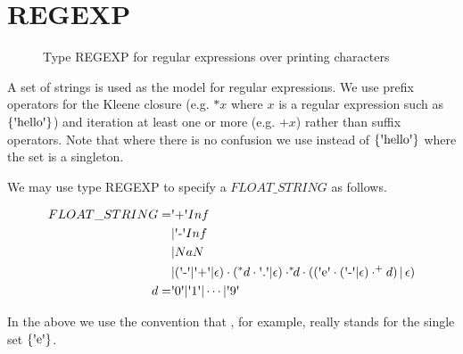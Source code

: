 \documentclass[runningheads,12pt]{article}
\begin{document}
\newpage
\appendix

\section{REGEXP}

\begin{figure}

\caption{Type REGEXP for regular expressions over printing characters}
\end{figure}

A set of strings is used as the model for regular expressions. We use prefix operators for the Kleene closure (e.g. $*x$ where $x$ is a regular expression such as $\{\squote{hello}\}$) and iteration at least one or more (e.g. $\textrm{+}x$) rather than suffix operators. Note that where there is no confusion we use  instead of $\{\squote{hello}\}$ where the set is a singleton. 

We may use type REGEXP to specify a $FLOAT\_STRING$ as follows.

\begin{align}
FLOAT\_STRING = &\squote{+}Inf\\
&|\squote{-}Inf\\
&|NaN\\
&|(\squote{-}|\squote{+}|\epsilon)\cdot(^*d\cdot\squote{.}|\epsilon)\cdot
	^*\!\!d\cdot ((\squote{e}\cdot(\squote{-}|\epsilon)\cdot^\textrm{+}d)\,|\,\epsilon)\\
d = &\squote{0} | \squote{1} | \cdots |\squote{9} 
\end{align}

In the above we use the convention that , for example, really stands for the single set $\{\squote{e}\}$.


\end{document}
